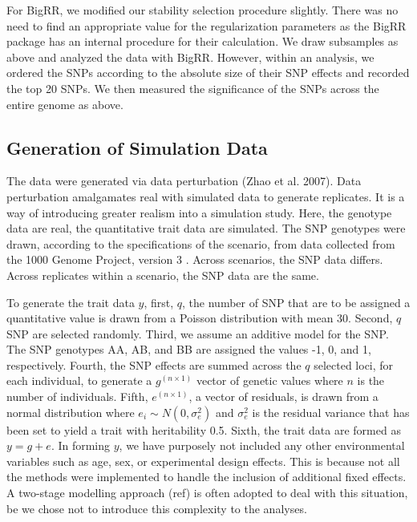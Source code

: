 \documentclass{article}
\begin{document}
For BigRR, we modified our stability selection procedure slightly. 
There was no need to find an appropriate value for the regularization 
parameters as the BigRR package has an internal procedure for their 
calculation. We draw subsamples as above and analyzed the data with BigRR. However, within an analysis, we ordered 
the SNPs according to the absolute size of their SNP effects and recorded the top 20 SNPs. We then measured the significance 
of the SNPs across the entire genome as above. 



\subsection{Generation of Simulation Data}

The data were generated via data perturbation (Zhao et al. 2007). Data perturbation amalgamates real with simulated data to generate replicates. 
It is a way of introducing greater realism into a simulation study. 
 Here, the genotype data are real, the 
quantitative trait data are simulated. 
 The SNP genotypes were drawn, 
according to the specifications of the scenario, from data collected from the 1000 Genome Project, version 3   \cite{10002010map}. 
Across scenarios, the SNP data differs. Across replicates within a scenario, the SNP data are the same. 

To generate the trait data $y$, first, $q$, the number of SNP that are to be assigned a quantitative value is drawn from a Poisson distribution with 
mean 30. Second, $q$ SNP are selected randomly. Third, we assume an additive model for the SNP. The SNP genotypes AA, AB, and BB 
are assigned the values -1, 0, and 1, respectively. Fourth, the SNP effects are summed across the $q$ selected loci, for each individual, to 
generate a $g^{(n \times 1)}$ vector of genetic values where $n$ is the number of individuals. 
Fifth, $e^{(n \times 1)}$, a vector of residuals, is drawn from a normal distribution where $e_i \sim N(0, \sigma^2_e)$ and $\sigma^2_e$ is 
the residual variance that has been set to yield a trait with heritability 0.5. Sixth,  the trait data are formed as $y =  g + e$.  
In forming $y$, we have purposely not included any other environmental variables such as age, sex, or experimental design effects. This is because 
not all the methods were implemented to handle the inclusion of additional fixed effects. A two-stage modelling approach (ref) 
is often adopted to deal with this situation, be we chose not to introduce this complexity to the analyses.  
\end{document}
